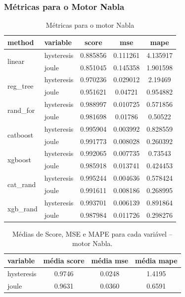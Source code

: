 \documentclass{article}
\begin{document}
\subsubsection{Métricas para o Motor Nabla}

\begin{table}[!htbp]
\centering
\caption{Métricas para o motor Nabla}
\begin{tabular}{llccc}
\toprule
\textbf{method} & \textbf{variable} & \textbf{score} & \textbf{mse} & \textbf{mape} \\
\midrule
\multirow{2}{*}{linear} 
    & hysteresis & 0.885856 & 0.111261 & 4.135917 \\
    & joule      & 0.851045 & 0.145358 & 1.901598 \\
\midrule
\multirow{2}{*}{reg\_tree} 
    & hysteresis & 0.970236 & 0.029012 & 2.19469 \\
    & joule      & 0.951621 & 0.04721 & 0.954882 \\
\midrule
\multirow{2}{*}{rand\_for} 
    & hysteresis & 0.988997 & 0.010725 & 0.571856 \\
    & joule      & 0.981698 & 0.01786 & 0.50522 \\
\midrule
\multirow{2}{*}{catboost} 
    & hysteresis & 0.995904 & 0.003992 & 0.828559 \\
    & joule      & 0.991773 & 0.008028 & 0.260392 \\
\midrule
\multirow{2}{*}{xgboost} 
    & hysteresis & 0.992065 & 0.007735 & 0.73543 \\
    & joule      & 0.985918 & 0.013741 & 0.424453 \\
\midrule
\multirow{2}{*}{cat\_rand} 
    & hysteresis & 0.995244 &	0.004636 &	0.578424\\
    & joule      & 0.991611 &	0.008186 &	0.268995\\
\midrule
\multirow{2}{*}{xgb\_rand} 
    & hysteresis & 0.993701 &	0.006139 &	0.891864\\
    & joule      &  0.987984 &	0.011726 &	0.298276\\
\bottomrule
\end{tabular}
\end{table}

\begin{table}[!htbp]
\centering
\caption{Médias de Score, MSE e MAPE para cada variável \--- motor Nabla.}
\begin{tabular}{lccc}
\hline
\textbf{variable} & \textbf{média score} & \textbf{média mse} & \textbf{média mape} \\
\hline
hysteresis & 0.9746 & 0.0248 & 1.4195 \\
joule      & 0.9631 & 0.0360 & 0.6591 \\
\hline
\end{tabular}
\label{tab:medias_variaveis_Nabla}
\end{table}
\end{document}
